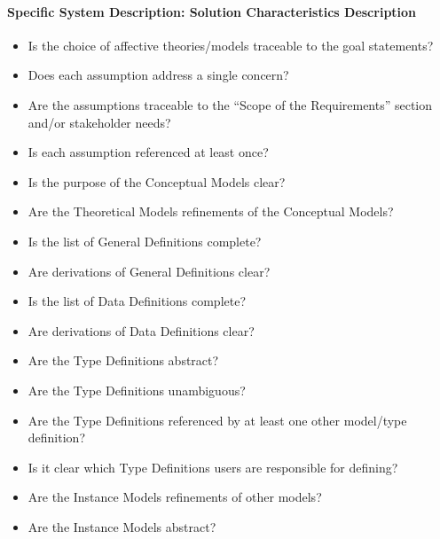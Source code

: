 \paragraph{Specific System Description: Solution Characteristics Description}
\begin{itemize}

    \item Is the choice of affective theories/models traceable to the goal
    statements?

    \item Does each assumption address a single concern?

    \item Are the assumptions traceable to the ``Scope of the Requirements''
    section and/or stakeholder needs?

    \item Is each assumption referenced at least once?

    \item Is the purpose of the Conceptual Models clear?

    \item Are the Theoretical Models refinements of the Conceptual Models?

    \item Is the list of General Definitions complete?

    \item Are derivations of General Definitions clear?

    \item Is the list of Data Definitions complete?

    \item Are derivations of Data Definitions clear?

    \item Are the Type Definitions abstract?

    \item Are the Type Definitions unambiguous?

    \item Are the Type Definitions referenced by at least one other model/type
    definition?

    \item Is it clear which Type Definitions users are responsible for defining?

    \item Are the Instance Models refinements of other models?

    \item Are the Instance Models abstract?


\end{itemize}
